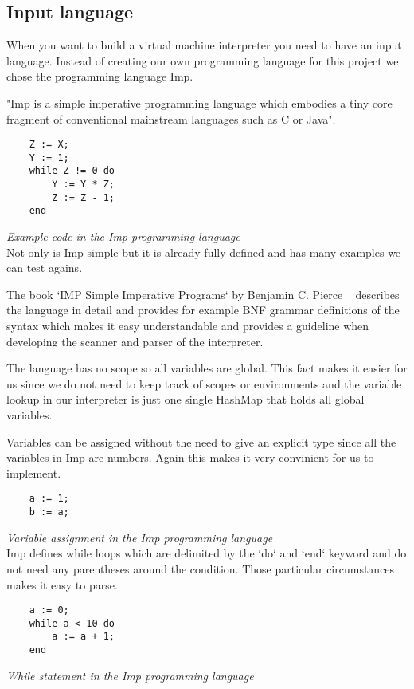\documentclass{article}
\begin{document}
\subsection{Input language} %
\label{sec:input_language}
When you want to build a virtual machine interpreter you need to have an
input language. Instead of creating our own programming language for this
project we chose the programming language Imp. ~\cite{Pierce:SF1}

"Imp is a simple imperative programming language which embodies a tiny core
fragment of conventional mainstream languages such as C or Java". ~\cite{Pierce:SF1}

\begin{verbatim}
    Z := X;
    Y := 1;
    while Z != 0 do
        Y := Y * Z;
        Z := Z - 1;
    end
\end{verbatim}
\textit{Example code in the Imp programming language} \\

Not only is Imp simple but it is already fully defined and has many examples
we can test agains.

The book `IMP Simple Imperative Programs` by Benjamin C. Pierce
~\cite{Pierce:SF1} describes the language in detail and provides for example
BNF grammar definitions of the syntax which makes it easy understandable and
provides a guideline when developing the scanner and parser of the interpreter.

The language has no scope so all variables are global. This fact makes it easier
for us since we do not need to keep track of scopes or environments and the
variable lookup in our interpreter is just one single HashMap that holds all 
global variables.

Variables can be assigned without the need to give an explicit type since all
the variables in Imp are numbers. Again this makes it very convinient for us to
implement.

\begin{verbatim}
    a := 1;
    b := a;
\end{verbatim}
\textit{Variable assignment in the Imp programming language} \\

Imp defines while loops which are delimited by the `do` and `end` keyword and
do not need any parentheses around the condition. Those particular circumstances
makes it easy to parse.

\begin{verbatim}
    a := 0;
    while a < 10 do
        a := a + 1;
    end
\end{verbatim}
\textit{While statement in the Imp programming language} \\
\end{document}
